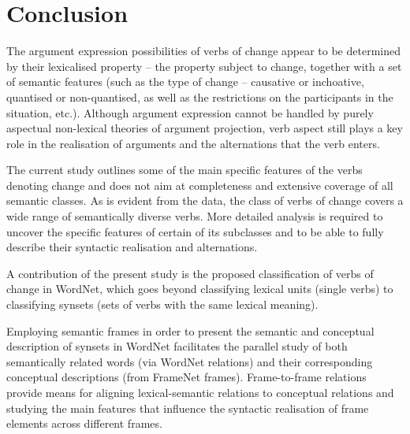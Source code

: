\documentclass[output=paper,colorlinks,citecolor=brown]{langscibook}
\begin{document}
\section{Conclusion}\label{sec:conclusions}

The argument expression possibilities of verbs of change appear to be determined by their lexicalised property -- the property subject to change, together with a set of semantic features (such as the type of change -- causative or inchoative, quantised or non-quantised, as well as the restrictions on the participants in the situation, etc.). Although argument expression cannot be handled by purely aspectual non-lexical theories of argument projection, verb aspect still plays a key role in the realisation of arguments and the alternations that the verb enters.

The current study outlines some of the main specific features of the verbs denoting change and does not aim at completeness and extensive coverage of all semantic classes. As is evident from the data, the class of verbs of change covers a wide range of semantically diverse verbs. More detailed analysis is required to uncover the specific features of certain of its subclasses and to be able to fully describe their syntactic realisation and alternations.


A contribution of the present study is the proposed classification of verbs of change in WordNet, which goes beyond classifying lexical units (single verbs) to classifying synsets (sets of verbs with the same lexical meaning). 

Employing semantic frames in order to present the semantic and conceptual description of synsets in WordNet facilitates the parallel study of both semantically related words (via WordNet relations) and their corresponding conceptual descriptions (from FrameNet frames). Frame-to-frame relations provide means for aligning lexical-semantic relations to conceptual relations and studying the main features that influence the syntactic realisation of frame elements across different frames.
\end{document}
